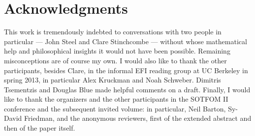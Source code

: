 \documentclass[letterpaper,12pt]{article}
\begin{document}
\section{Acknowledgments}
This work is tremendously indebted to conversations with two people in particular --- John Steel and Clare Stinchcombe --- without whose mathematical help and philosophical insights it would not have been possible. Remaining misconceptions are of course my own. I would also like to thank the other participants, besides Clare, in the informal EFI reading group at UC Berkeley in spring 2013, in particular Alex Kruckman and Noah Schweber. Dimitris Tsementzis and Douglas Blue made helpful comments on a draft. Finally, I would like to thank the organizers and the other participants in the SOTFOM II conference and the subsequent invited volume: in particular, Neil Barton, Sy-David Friedman, and the anonymous reviewers, first of the extended abstract and then of the paper itself.


\end{document}
